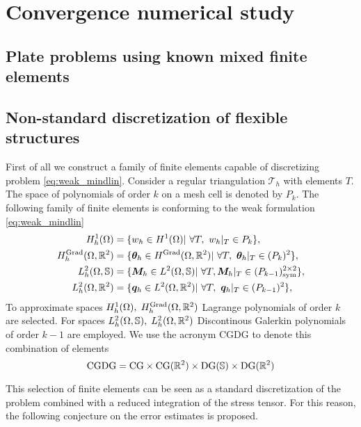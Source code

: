 \chapter{Convergence numerical study}\label{ch:conv}

\section{Plate problems using known mixed finite elements}

\section{Non-standard discretization of flexible structures}


First of all we construct a family of finite elements capable of discretizing problem \eqref{eq:weak_mindlin}. Consider a regular triangulation $\mathcal{T}_h$ with elements $T$. The space of polynomials of order $k$ on a mesh cell is denoted by $P_k$. The following family of finite elements is conforming to the weak formulation \eqref{eq:weak_mindlin}
\begin{equation}\label{eq:CGDG}
\begin{aligned}
H_{h}^{1}(\Omega) &= \{w_h \in H^1(\Omega) \vert \ \forall T, \ w_h|_{T} \in P_{k} \}, \\
H_h^{\Grad}(\Omega, \bbR^2) &= \{ \bm{\theta}_h \in H^{\Grad}(\Omega, \bbR^2) \vert \ \forall T,\ \bm{\theta}_h|_{T} \in (P_{k})^2 \}, \\
L_h^2(\Omega, \mathbb{S}) &= \{ \bm{M}_h \in L^2(\Omega, \mathbb{S}) \vert \ \forall T, \bm{M}_h|_{T} \in (P_{k-1})^{2 \times 2}_{\text{sym}} \}, \\
L_h^2(\Omega, \bbR^2) &= \{\bm{q}_h \in L^2(\Omega, \bbR^2)  \vert \ \forall T,\ \bm{q}_h|_{T} \in (P_{k-1})^{2} \}, \\
\end{aligned}
\end{equation}
To approximate spaces $H_h^{1}(\Omega), \; H_h^{\operatorname*{Grad}}(\Omega, \mathbb{R}^2)$ Lagrange polynomials of order $k$ are selected. For spaces $L_h^2(\Omega, \mathbb{S}), \; L_h^2(\Omega, \mathbb{R}^2)$ Discontinous Galerkin polynomials of order $k-1$ are employed. We use the acronym CGDG to denote this combination of elements
\[
\mathrm{CGDG} = \mathrm{CG} \times \mathrm{CG}(\mathbb{R}^2) \times \mathrm{DG}(\mathbb{S}) \times \mathrm{DG}(\mathbb{R}^2)
\]

This selection of finite elements can be seen as a standard discretization of the problem combined with a reduced integration of the stress tensor. For this reason, the following conjecture on the error estimates is proposed. 

